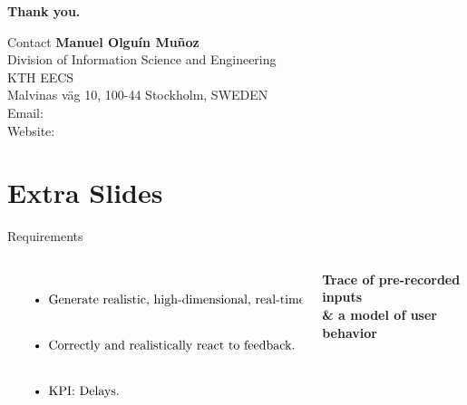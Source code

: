 \documentclass[aspectratio=1610, notes]{beamer}
\begin{document}
\startpage
\begin{frame}{}
    \begin{center}
        \textbf{\Large Thank you.}\\
        \vspace{.1\textheight}%
        \begin{block}{\footnotesize Contact}
            \tiny%
            \textbf{Manuel Olguín Muñoz}\\
            Division of Information Science and Engineering\\
            KTH EECS\\
            Malvinas väg 10, 100-44 Stockholm, SWEDEN\\
            \vspace{.01\textheight}
            Email: \\
            Website: \\
        \end{block}
    \end{center}
    \vspace{.1\textheight}%
\end{frame}

\normalpage
\section{Extra Slides}
\begin{frame}{Requirements}
    \begin{columns}[onlytextwidth]
        \begin{column}{.5\linewidth}
            $\left.
                \begin{tabular}{p{.8\linewidth}}
                    \begin{itemize}
                        \itemsep2em
                        \item Generate realistic, high-dimensional, real-time inputs.
                        \item Correctly and realistically react to feedback.
                        \item KPI: Delays.
                    \end{itemize}
                \end{tabular}%
                \right\}$
        \end{column}%
        \begin{column}{.5\linewidth}
            \centering%
            \Large\bfseries%
            Trace of pre-recorded inputs\\
            \& a model of user behavior\\
        \end{column}
    \end{columns}
\end{frame}
\end{document}
